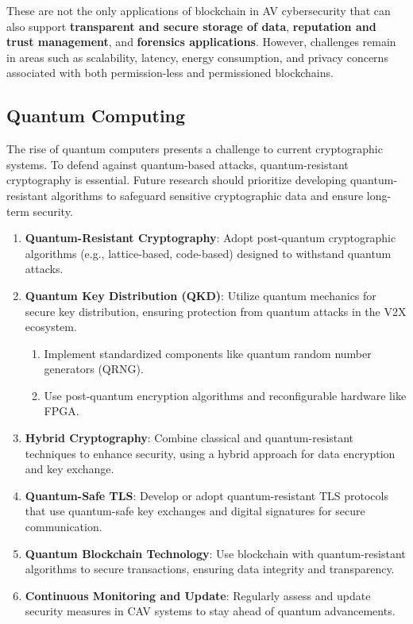 These are not the only applications of blockchain in AV cybersecurity that can also support \textbf{transparent and secure storage of data},
\textbf{reputation and trust management}, and \textbf{forensics applications}.
However, challenges remain in areas such as scalability, latency, energy consumption,
and privacy concerns associated with both permission-less and permissioned blockchains\cite{bendiab2023autonomous, giannaros2023autonomous, khan2020cyber, admass2023cyber, ahmad2023machine}.

\subsection{Quantum Computing}\label{subsec:quantum-computing}
The rise of quantum computers presents a challenge to current cryptographic systems.
To defend against quantum-based attacks, quantum-resistant cryptography is essential.
Future research should prioritize
developing quantum-resistant algorithms to safeguard sensitive cryptographic data and ensure long-term security\cite{ahmad2023machine, admass2023cyber}.

\begin{enumerate}
    \item \textbf{Quantum-Resistant Cryptography}:
    Adopt post-quantum cryptographic algorithms (e.g., lattice-based, code-based) designed to withstand quantum attacks.
    \item \textbf{Quantum Key Distribution (QKD)}: Utilize quantum mechanics for secure key distribution,
    ensuring protection from quantum attacks in the V2X ecosystem.
    \begin{enumerate}
        \item Implement standardized components like quantum random number generators (QRNG).
        \item Use post-quantum encryption algorithms and reconfigurable hardware like FPGA.
    \end{enumerate}
    \item \textbf{Hybrid Cryptography}: Combine classical and quantum-resistant techniques to enhance security,
    using a hybrid approach for data encryption and key exchange.
    \item \textbf{Quantum-Safe TLS}:
    Develop or adopt quantum-resistant TLS protocols
    that use quantum-safe key exchanges and digital signatures for secure communication.
    \item \textbf{Quantum Blockchain Technology}: Use blockchain with quantum-resistant algorithms to secure transactions,
    ensuring data integrity and transparency.
    \item \textbf{Continuous Monitoring and Update}:
    Regularly assess and update security measures in CAV systems to stay ahead of quantum advancements.
\end{enumerate}

